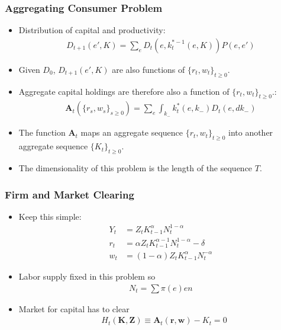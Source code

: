 \documentclass[english,xcolor=svgnames]{beamer}
\begin{document}
\begin{frame}
    \frametitle{Aggregating Consumer Problem}
    \begin{itemize}
        \item Distribution of capital and productivity:
        \begin{align*}
        	D_{t+1}(e',K) = \sum_e D_t(e,k_t^{*-1}(e,K))P(e,e')
        \end{align*}
        \item Given $D_0$, $D_{t+1}(e',K)$ are also functions of $\{r_t,w_t\}_{t\ge 0 }$.
        \item Aggregate capital holdings are therefore also a function of $\{r_t,w_t\}_{t\ge 0 }$.:
        \begin{align*}
        	\mathbf{A}_t(\{r_s,w_s\}_{s\ge 0 }) = \sum_e \int_{k_{-}} k_t^*(e,k_{-}) D_t(e,dk_{-})
        \end{align*}
        \item The function $\mathbf{A}_t$ maps an aggregate sequence $\{r_t,w_t\}_{t\ge 0 }$ into another aggregate sequence $\{K_t\}_{t\ge 0}$.
        \item The dimensionality of this problem is the length of the sequence $T$.
	\end{itemize}
\end{frame}


\begin{frame}
    \frametitle{Firm and Market Clearing}
    \begin{itemize}
        \item Keep this simple:
        \begin{align*}
        	Y_t &= Z_t K_{t-1}^{\alpha} N_t^{1-\alpha} \\
        	 r_t &= \alpha  Z_t K_{t-1}^{\alpha-1} N_t^{1-\alpha} - \delta \\
        	 w_t &= (1-\alpha) Z_t K_{t-1}^{\alpha} N_t^{-\alpha}
        \end{align*}
        \item Labor supply fixed in this problem so
        \begin{align*}
        	N_t = \sum \pi(e) en
        \end{align*}
        \item Market for capital has to clear
        \begin{align*}
        	&H_t(\bm{K},\bm{Z})  \equiv \mathbf{A}_t\left( \mathbf{r}, \mathbf{w} \right)   - K_t = 0
        \end{align*}
	\end{itemize}
\end{frame}
\end{document}
